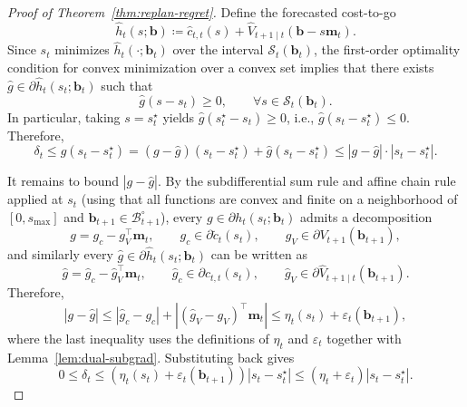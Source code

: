 \documentclass{uai2026} %
\newcommand{\1}{\mathbf{1}}
\newcommand{\scalt}{\mathcal{S}_{t}}
\renewcommand{\epsilon}{\varepsilon}
\newcommand{\bcal}{\mathcal{B}}
\begin{document}
\begin{proof}[Proof of Theorem~\ref{thm:replan-regret}]
  Define the forecasted cost-to-go
  \begin{equation*}
    \hat{h}_t(s;\mathbf{b})
    \coloneqq
    \hat{c}_{t,t}(s)+\hat{V}_{t+1\mid t}(\mathbf{b}-s\mathbf{m}_t).
  \end{equation*}
  Since $s_t$ minimizes $\hat{h}_t(\cdot;\mathbf{b}_t)$ over the interval $\scalt(\mathbf{b}_t)$, the first-order optimality condition for convex minimization over a convex set implies that there exists $\hat{g}\in\partial \hat{h}_t(s_t;\mathbf{b}_t)$ such that
  \begin{equation*}
    \hat{g}(s-s_t)\ge 0,\qquad \forall s\in\scalt(\mathbf{b}_t).
  \end{equation*}
  In particular, taking $s=s_t^{\star}$ yields $\hat{g}(s_t^{\star}-s_t)\ge 0$, i.e., $\hat{g}(s_t-s_t^{\star})\le 0$.
  Therefore,
  \begin{equation*}
    \delta_t
    \le g(s_t-s_t^{\star})
    = (g-\hat{g})(s_t-s_t^{\star})+\hat{g}(s_t-s_t^{\star})
    \le |g-\hat{g}|\cdot |s_t-s_t^{\star}|.
  \end{equation*}

  It remains to bound $|g-\hat{g}|$.
  By the subdifferential sum rule and affine chain rule applied at $s_t$ (using that all functions are convex and finite on a neighborhood of $[0,s_{\max}]$ and $\mathbf{b}_{t+1}\in\bcal_{t+1}^{\circ}$), every $g\in\partial h_t(s_t;\mathbf{b}_t)$ admits a decomposition
  \begin{equation*}
    g = g_c - g_V^{\top}\mathbf{m}_t,
    \qquad
    g_c\in\partial \tilde{c}_t(s_t),
    \qquad
    g_V\in\partial V_{t+1}(\mathbf{b}_{t+1}),
  \end{equation*}
  and similarly every $\hat{g}\in\partial \hat{h}_t(s_t;\mathbf{b}_t)$ can be written as
  \begin{equation*}
    \hat{g} = \hat{g}_c - \hat{g}_V^{\top}\mathbf{m}_t,
    \qquad
    \hat{g}_c\in\partial \hat{c}_{t,t}(s_t),
    \qquad
    \hat{g}_V\in\partial \hat{V}_{t+1\mid t}(\mathbf{b}_{t+1}).
  \end{equation*}
  Therefore,
  \begin{equation*}
    |g-\hat{g}|
    \le |\hat{g}_c-g_c| + |(\hat{g}_V-g_V)^{\top}\mathbf{m}_t|
    \le \eta_t(s_t)+\epsilon_t(\mathbf{b}_{t+1}),
  \end{equation*}
  where the last inequality uses the definitions of $\eta_t$ and $\epsilon_t$ together with Lemma~\ref{lem:dual-subgrad}.
  Substituting back gives
  \begin{equation*}
    0\le \delta_t \le \left(\eta_t(s_t)+\epsilon_t(\mathbf{b}_{t+1})\right)|s_t-s_t^{\star}|
    \le (\eta_t+\epsilon_t)|s_t-s_t^{\star}|.
  \end{equation*}


\end{proof}
\end{document}
